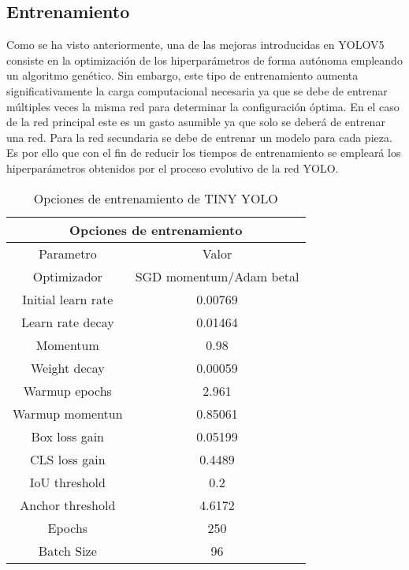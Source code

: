 \subsection{Entrenamiento}
\label{chap:Sistema de visión artificial sec:Tiny YOLO Entrenamiento}
Como se ha visto anteriormente, una de las mejoras introducidas en YOLOV5 consiste en la optimización de los hiperparámetros de forma autónoma empleando un algoritmo genético. Sin embargo, este tipo de entrenamiento aumenta significativamente la carga computacional necesaria ya que se debe de entrenar múltiples veces la misma red para determinar la configuración óptima. En el caso de la red principal este es un gasto asumible ya que solo se deberá de entrenar una red. Para la red secundaria se debe de entrenar un modelo para cada pieza. Es por ello que con el fin de reducir los tiempos de entrenamiento se empleará los hiperparámetros obtenidos por el proceso evolutivo de la red YOLO.

\begin{table}[ht]
  \centering
    \begin{tabular}{|c|c|}
    \hline
    \multicolumn{2}{|c|}{Opciones de entrenamiento} \\
    \hline
    Parametro & Valor \\
    \hline
    Optimizador & SGD momentum/Adam betal \\
    \hline
    Initial learn rate & 0.00769 \\
    \hline
    Learn rate decay & 0.01464 \\
    \hline
    Momentum & 0.98 \\
    \hline
    Weight decay & 0.00059 \\
    \hline
    Warmup epochs & 2.961 \\
    \hline
    Warmup momentun & 0.85061 \\
    \hline
    Box loss gain & 0.05199 \\
    \hline
    CLS loss gain & 0.4489 \\
    \hline
    IoU threshold & 0.2 \\
    \hline
    Anchor threshold & 4.6172 \\
    \hline
    Epochs & 250 \\
    \hline
    Batch Size & 96 \\
    \hline
    \end{tabular}
  \caption{Opciones de entrenamiento de TINY YOLO}
  \label{chap:Sistema de visión artificial tab:TINY YOLO options}
\end{table}

